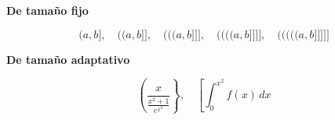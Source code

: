 \documentclass[10pt,a4paper]{report}
\begin{document}
\bigskip
\textbf{De tamaño fijo}

\begin{equation}
(a,b],
\quad
\big( (a,b] \big],
\quad
\Big(\big( (a,b] \big]\Big],
\quad
\bigg(\Big(\big( (a,b] \big]\Big]\bigg],
\quad
\Bigg(\bigg(\Big(\big( (a,b] \big]\Big]\bigg]\Bigg]
\end{equation}
\bigskip






\bigskip
\textbf{De tamaño adaptativo}

\begin{equation}
\left(\frac{x}{\frac{x^2+1}{e^{x^3}}}\right\},
\quad
\left[\int_{0}^{x^2}f(x)\,dx\right.
\end{equation}
\bigskip







\end{document}
